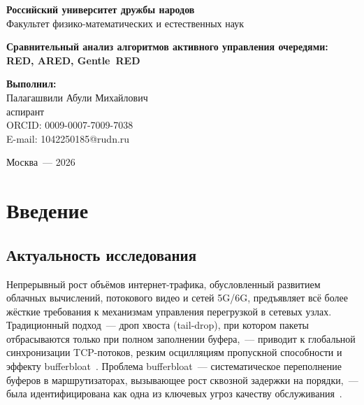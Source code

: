 \documentclass[12pt,a4paper]{article}
\begin{document}
\begin{titlepage}
  \centering
  \textbf{Российский университет дружбы народов}\\
  \vspace{0.5cm}
  Факультет физико-математических и естественных наук\\
  \vspace{2cm}

  {\Large\bfseries Сравнительный анализ алгоритмов активного управления очередями: RED, ARED, Gentle~RED}\\

  \vspace{3cm}
  \begin{flushright}
    \textbf{Выполнил:}\\
    Палагашвили Абули Михайлович\\
    аспирант\\
    ORCID: 0009-0007-7009-7038\\
    E-mail: 1042250185@rudn.ru\\
  \end{flushright}

  \vfill
  Москва~--- 2026
\end{titlepage}

\setcounter{page}{1}
\tableofcontents
\newpage

\section{Введение}
\label{sec:intro}

\subsection{Актуальность исследования}

Непрерывный рост объёмов интернет-трафика, обусловленный развитием облачных вычислений, потокового видео и сетей 5G/6G, предъявляет всё более жёсткие требования к механизмам управления перегрузкой в сетевых узлах. Традиционный подход~--- дроп хвоста (tail-drop), при котором пакеты отбрасываются только при полном заполнении буфера,~--- приводит к глобальной синхронизации TCP-потоков, резким осцилляциям пропускной способности и эффекту bufferbloat~\cite{gettys2012}. Проблема bufferbloat~--- систематическое переполнение буферов в маршрутизаторах, вызывающее рост сквозной задержки на порядки,~--- была идентифицирована как одна из ключевых угроз качеству обслуживания~\cite{rfc8289}.
\end{document}
